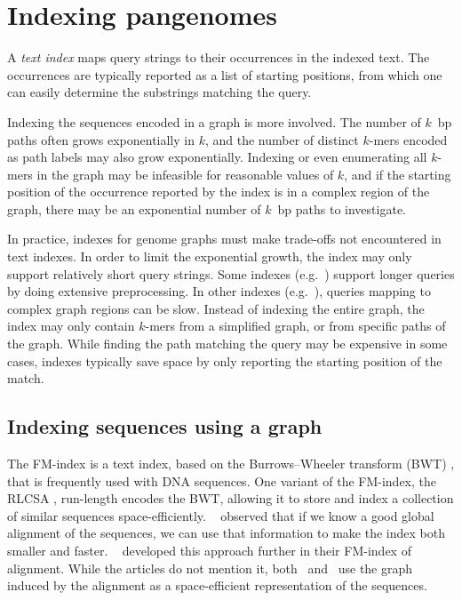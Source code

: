 \section{Indexing pangenomes} %

A \emph{text index} maps query strings to their occurrences in the indexed text.
The occurrences are typically reported as a list of starting positions, from which one can easily determine the substrings matching the query.

Indexing the sequences encoded in a graph is more involved.
The number of $k$~bp paths often grows exponentially in $k$, and the number of distinct $k$-mers encoded as path labels may also grow exponentially.
Indexing or even enumerating all $k$-mers in the graph may be infeasible for reasonable values of $k$, and if the starting position of the occurrence reported by the index is in a complex region of the graph, there may be an exponential number of $k$~bp paths to investigate.

In practice, indexes for genome graphs must make trade-offs not encountered in text indexes.
In order to limit the exponential growth, the index may only support relatively short query strings.
Some indexes (e.g.\ \cite{Siren_2014}) support longer queries by doing extensive preprocessing.
In other indexes (e.g.\ \cite{Thachuk_2013,Huang_2013,Maciuca_2016}), queries mapping to complex graph regions can be slow.
Instead of indexing the entire graph, the index may only contain $k$-mers from a simplified graph, or from specific paths of the graph.
While finding the path matching the query may be expensive in some cases, indexes typically save space by only reporting the starting position of the match.

\subsection{Indexing sequences using a graph}

The FM-index \cite{Ferragina_2005} is a text index, based on the Burrows--Wheeler transform (BWT) \cite{Burrows_1994}, that is frequently used with DNA sequences.
One variant of the FM-index, the RLCSA \cite{Maekinen_2010}, run-length encodes the BWT, allowing it to store and index a collection of similar sequences space-efficiently.
\citeauthor{Huang_2010}\ \cite{Huang_2010} observed that if we know a good global alignment of the sequences, we can use that information to make the index both smaller and faster.
\citeauthor{Na_2016}\ \cite{Na_2016,Na_2018} developed this approach further in their FM-index of alignment.
While the articles do not mention it, both \citeauthor{Huang_2010}\ and \citeauthor{Na_2016}\ use the graph induced by the alignment as a space-efficient representation of the sequences.

